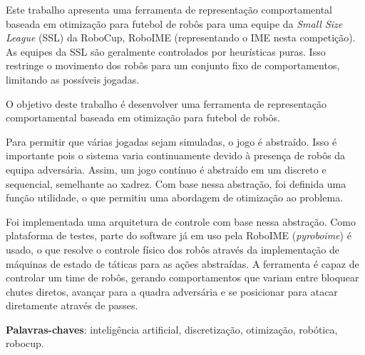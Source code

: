 \setlength{\absparsep}{18pt} %
\begin{resumo}

  Este trabalho apresenta uma ferramenta de representação comportamental baseada
  em otimização para futebol de robôs para uma equipe da \textit{Small Size
  League} (SSL) da RoboCup, RoboIME (representando o IME nesta competição).  As
  equipes da SSL são geralmente controlados por heurísticas puras.  Isso
  restringe o movimento dos robôs para um conjunto fixo de comportamentos,
  limitando as possíveis jogadas.

  O objetivo deste trabalho é desenvolver uma ferramenta de representação
  comportamental baseada em otimização para futebol de robôs.

  Para permitir que várias jogadas sejam simuladas, o jogo é abstraído.  Isso é
  importante pois o sistema varia continuamente devido à presença de robôs da
  equipa adversária.  Assim, um jogo contínuo é abstraído em um discreto e
  sequencial, semelhante ao xadrez.  Com base nessa abstração, foi definida uma
  função utilidade, o que permitiu uma abordagem de otimização ao problema.

  Foi implementada uma arquitetura de controle com base nessa abstração.  Como
  plataforma de testes, parte do software já em uso pela RoboIME
  (\textit{pyroboime}) é usado, o que resolve o controle físico dos robôs
  através da implementação de máquinas de estado de táticas para as ações
  abstraídas.  A ferramenta é capaz de controlar um time de robôs, gerando
  comportamentos que variam entre bloquear chutes diretos, avançar para a quadra
  adversária e se posicionar para atacar diretamente através de passes.

  \textbf{Palavras-chaves}: inteligência artificial, discretização, otimização, robótica, robocup.
\end{resumo}


